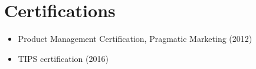 \section{Certifications}
\vspace{0.5em}

\begin{itemize}
  \item Product Management Certification, Pragmatic Marketing (2012)
  \item TIPS certification (2016)
\end{itemize}
